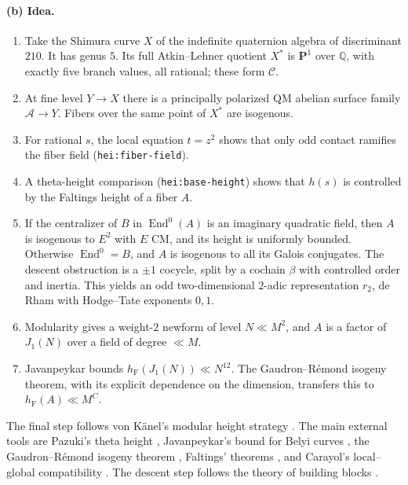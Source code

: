 \documentclass[11pt]{article}
\theoremstyle{definition}
\newcommand{\Q}{\mathbb Q}
\newcommand{\PP}{\mathbf P}
\newcommand{\Cpts}{\mathcal C}
\newcommand{\lbl}[1]{\texttt{#1}}
\begin{document}
\paragraph{(b) Idea.}
\begin{enumerate}
\item Take the Shimura curve $X$ of the indefinite quaternion algebra of
discriminant $210$.  It has genus $5$.  Its full Atkin--Lehner quotient
$X^*$ is $\PP^1$ over $\Q$, with exactly five branch values, all rational;
these form $\Cpts$.
\item At fine level $Y\to X$ there is a principally polarized QM abelian
surface family $\mathcal A\to Y$.  Fibers over the same point of $X^*$ are
isogenous.
\item For rational $s$, the local equation $t=z^2$ shows that only odd
contact ramifies the fiber field (\lbl{hei:fiber-field}).
\item A theta-height comparison (\lbl{hei:base-height}) shows that
$h(s)$ is controlled by the Faltings height of a fiber $A$.
\item If the centralizer of $B$ in $\operatorname{End}^0(A)$ is an
imaginary quadratic field, then $A$ is isogenous to $E^2$ with $E$ CM, and
its height is uniformly bounded.  Otherwise $\operatorname{End}^0=B$, and $A$ is isogenous to all its Galois
conjugates.  The descent obstruction is a $\pm1$ cocycle, split by a
cochain $\beta$ with controlled order and inertia.  This yields an odd
two-dimensional $2$-adic representation $r_2$, de Rham with Hodge--Tate
exponents $0,1$.
\item Modularity gives a weight-$2$ newform of level $N\ll M^2$, and $A$
is a factor of $J_1(N)$ over a field of degree $\ll M$.
\item Javanpeykar bounds $h_{\mathrm F}(J_1(N))\ll N^{12}$.  The
Gaudron--R\'emond isogeny theorem, with its explicit dependence on the
dimension, transfers this to $h_{\mathrm F}(A)\ll M^C$.
\end{enumerate}
The final step follows von K\"anel's modular height strategy
\cite{vonKaenel2021}.  The main external tools are Pazuki's theta height
\cite{Pazuki2012}, Javanpeykar's bound for Belyi curves
\cite{Javanpeykar2014}, the Gaudron--R\'emond isogeny theorem
\cite{GaudronRemond2014}, Faltings' theorems \cite{Faltings1983}, and
Carayol's local--global compatibility \cite{Carayol1986}.  The descent
step follows the theory of building blocks \cite{Ribet1992,Pyle1995}.
\end{document}
